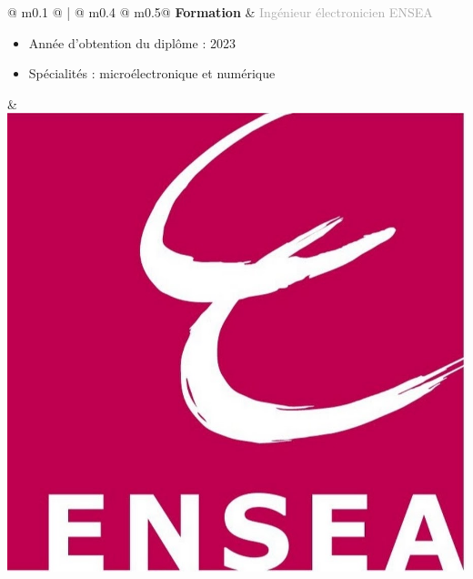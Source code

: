 \documentclass{article}
\begin{document}
\begin{tabular}{@{\hspace{0.05\textwidth}} m{0.1\textwidth} @ {\hspace{0.05\textwidth}} ! {\color{secondaryBlue}\vline width 2pt \hspace{0.05\textwidth}} @ {}m{0.4\textwidth} @{\hspace{0.15\textwidth}} m{0.5\linewidth}@{}}
    \textcolor{secondaryBlue}{\textbf{Formation}} & 
    \textcolor{darkGray}{Ingénieur électronicien ENSEA}
    \begin{itemize}[label={\textcolor{gray!80}{\checkmark}}, topsep=0pt, partopsep=0pt, itemsep=0pt, parsep=0pt, after=\vspace*{-\baselineskip}]
        \item \textcolor{gray!80}{Année d'obtention du diplôme : 2023}
        \item \textcolor{gray!80}{Spécialités : microélectronique et numérique} 
    \end{itemize} &
    \includegraphics[width=0.1\linewidth]{ensea.jpg}
\end{tabular}


\end{document}
